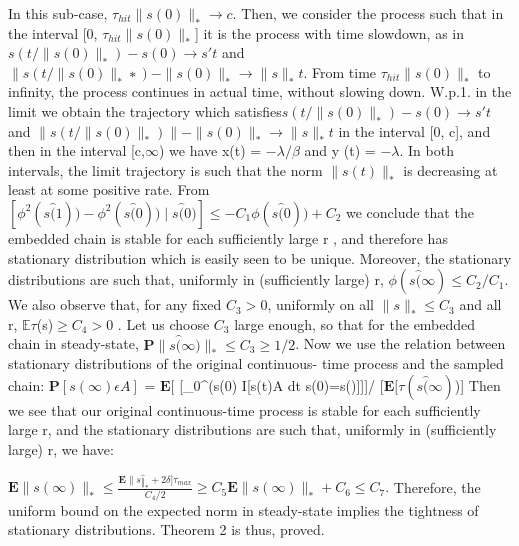 \newline In this sub-case, $\tau_{hit} \|s(0)\|_\ast \rightarrow c.$ Then, we consider the process such that in the interval [0, $\tau_{hit} \|s(0)\|_\ast$] it is the process with time slowdown, as in  $s(t/ \|s(0)\|_\ast) - s(0) \rightarrow s \prime t $ and $\|s(t/\|s(0)\| _\ast∗) - \|s(0)\|_\ast \rightarrow  \|s\| _\ast t.$ From time $\tau_{hit}\|s(0)\|_\ast$ to infinity, the process continues in actual time, without slowing down. W.p.1. in the limit we obtain the trajectory which satisfies\newline $s(t/\|s(0)\|_\ast) − s(0) \rightarrow s\prime t $ and $\|s(t/\|s(0)\|_\ast)\| - \|s(0)\|_\ast \rightarrow \|s\|_\ast t $ in the interval [0, c], and then in the interval [c,$\infty$) we have x(t) = $-\lambda/\beta $ and y \prime(t) = $-\lambda$. In both intervals, the limit trajectory is such that the norm $\|s(t)\|_\ast$ is decreasing at least at some positive rate. \newline\newline
From $[\phi^2(s \hat(1)) - \phi^2(s\hat(0)) \mid s \hat(0)] \leq  -  C_1 \phi(s \hat(0)) + C_2$ we conclude that the embedded chain is stable for each sufficiently large r , and therefore has stationary distribution which is easily seen to be unique. Moreover, the stationary distributions are such that, uniformly in (sufficiently large) r, $\phi( s\hat(\infty) \leq C_2/C_1$.
\newline \newline We also observe that, for any fixed $C_3 > 0$, uniformly on all $\|s\|_\ast \leq C_3$ and all r, $\mathbb{E} \tau $(s)$ \geq C_4 > 0$ . Let us choose $C_3$ large enough, so that for the embedded chain in steady-state, $\mathbf{P}{\|s\hat(\infty)\|_\ast\leq C_3}\geq 1/2 $.
\newline \newline
Now we use the relation between stationary distributions of the original continuous- time process and the sampled chain: \newline
$\mathbf{P}[s(\infty) \epsilon A] $ = $\mathbf{E}[ $ [\int_{0}^{\tau(s(0)} I[s(t)\epsilon A dt \mid s(0)=s\hat(\infty)]]]/ [$\mathbf{E}[\tau(s\hat(\infty)$)]
\newline 
Then we see that our original continuous-time process is stable for each sufficiently large r, and the stationary distributions are such that, uniformly in (sufficiently large) r, we have: \newline

$\mathbf{E} \|s(\infty)\| _\ast \leq \frac {\mathbf{E} \|s\hat\| _\ast + 2\delta] \tau_{max}} {C_4/2} \geq C_5 \mathbf{E}\|s(\infty)\|_\ast + C_6 \leq C_7.$
\newline Therefore, the uniform bound on the expected norm in steady-state implies the tightness of stationary distributions.  Theorem 2 is thus, proved.	
	
	
	


